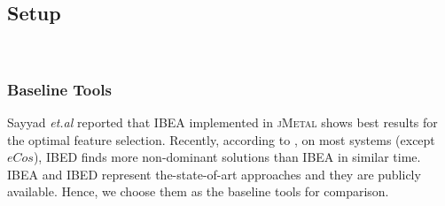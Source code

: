\subsection{Setup}\label{subsection:qualityindicator}~\label{ssec:setup}
\vspace{-3mm}
\subsubsection{Baseline Tools}\label{subsecc:implementationsetup}
Sayyad \emph{et.al} \cite{DBLP:conf/icse/SayyadMA13,conf/cmsbse/SayyadMA13} reported that IBEA implemented in \textsc{jMetal} shows best results for the optimal feature selection. %
Recently, according to \cite{DBLP:journals/asc/XueZT0CC016}, on most systems (except $eCos$), IBED finds more non-dominant solutions than IBEA in similar time.  IBEA and IBED represent the-state-of-art approaches and they are publicly available. Hence, we choose them as the baseline tools for comparison.




